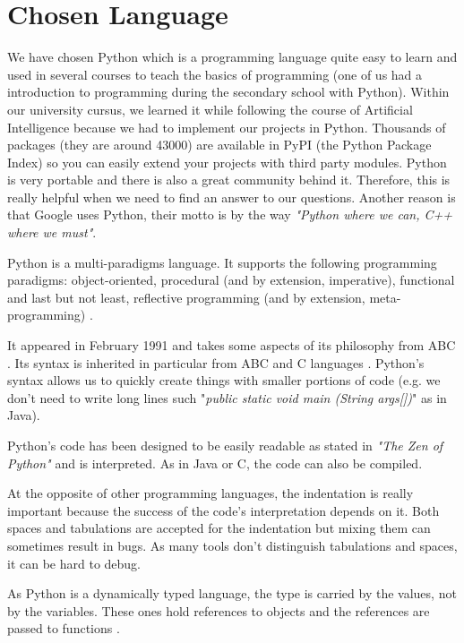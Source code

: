 \section{Chosen Language}
We have chosen Python which is a programming language quite easy to learn and used in several courses to teach the basics of programming (one of us had a introduction to programming during the secondary school with Python). Within our university cursus, we learned it while following the course of Artificial Intelligence because we had to implement our projects in Python. Thousands of packages (they are around 43000) are available in PyPI (the Python Package Index) so you can easily extend your projects with third party modules. Python is very portable and there is also a great community behind it. Therefore, this is really helpful when we need to find an answer to our questions. Another reason is that Google uses Python, their motto is by the way \textit{"Python where we can, C++ where we must"}.
\newline

Python is a multi-paradigms language. It supports the following programming paradigms: object-oriented, procedural (and by extension, imperative), functional and last but not least, reflective programming (and by extension, meta-programming) \cite{martelli2006python, python_doc_functional}.

It appeared in February 1991 and takes some aspects of its philosophy from ABC \cite{python_doc_why}. Its syntax is inherited in particular from ABC and C languages \cite{wikipediaEN_history_python}. Python's syntax allows us to quickly create things with smaller portions of code (e.g. we don't need to write long lines such "\textit{public static void main (String args[])}" as in Java).

Python's code has been designed to be easily readable as stated in \textit{"The Zen of Python"} \cite{python_pep0020} and is interpreted. As in Java or C, the code can also be compiled.

At the opposite of other programming languages, the indentation is really important because the success of the code's interpretation depends on it. Both spaces and tabulations are accepted for the indentation but mixing them can sometimes result in bugs. As many tools don't distinguish tabulations and spaces, it can be hard to debug.

As Python is a dynamically typed language, the type is carried by the values, not by the variables. These ones hold references to objects and the references are passed to functions \cite{wikipediaEN_python_syntax_semantics}.

